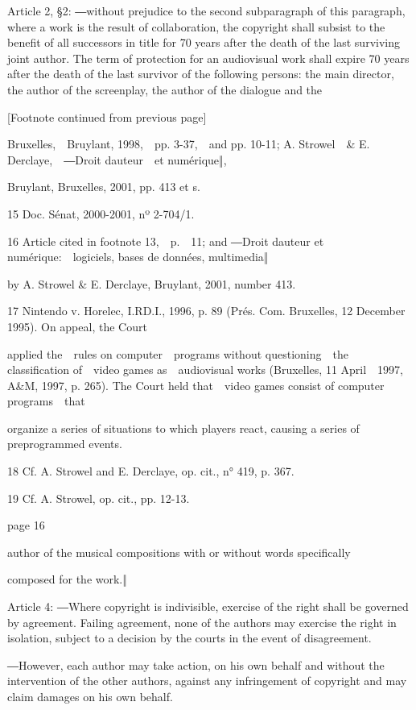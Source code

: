 \documentclass[
]{article}
\begin{document}
{Article 2, §2: ―}{without prejudice to the second subparagraph of this
paragraph, where a work is the result of collaboration, the copyright
shall subsist to the benefit of all successors in title for 70 years
after the death of the last surviving joint author. The term of
protection for an audiovisual work shall expire 70 years after the death
of the last survivor of the following persons: the main director, the
author of the screenplay, the author of the dialogue and the}

{{[}Footnote continued from previous page{]}}

{Bruxelles,~~Bruylant, 1998,~~pp. 3-37,~~and pp. 10-11; A. Strowel~~\&
E. }{Derclaye,~~―Droit d\textquotesingle auteur~~et numérique‖,}

{Bruylant, Bruxelles, 2001, pp. 413 }{et s.}

{15 }{Doc. Sénat, 2000-2001, nº 2-704/1.}

{16 }{Article cited in footnote 13,~~p.~~11; }{and ―Droit
d\textquotesingle auteur et numérique:~~logiciels, bases de données,
multimedia‖}

{by A. Strowel \& E. Derclaye, Bruylant, 2001, number 413.}

{17 }{Nintendo v. Horelec}{, I.RD.I., 1996, p. 89 (Prés. Com. Bruxelles,
12 December 1995). On appeal, the Court}

{applied the~~rules on computer~~programs without questioning~~the
classification of~~video games as~~audiovisual works (Bruxelles, 11
April~~1997, A\&M, 1997, p. 265). The Court held that~~video games
consist of computer programs~~that}

{organize a series of situations to which players react, causing a
series of preprogrammed events.}

{18 }{Cf. A. Strowel and E. Derclaye, }{op. cit.}{, n° 419, p. 367.}

{19 }{Cf. A. Strowel, }{op. cit.}{, pp. 12-13.}

{page 16}

{author of the musical compositions with or without words specifically}

{composed for the work.‖}

{Article 4: }{―Where copyright is indivisible, exercise of the right
shall be }{governed by agreement. Failing agreement, none of the authors
may exercise the right in isolation, subject to a decision by the courts
in the event of disagreement.}

{―However, each author may take action, on his own behalf and without
the }{intervention of the other authors, against any infringement of
copyright and may claim damages on his own behalf.}
\end{document}

